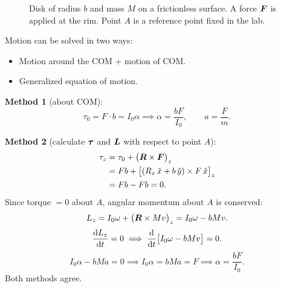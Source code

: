 \begin{example}

\begin{figure}[H]
    \centering
    \caption{Disk of radius $b$ and mass $M$ on a frictionless surface.
             A force $\vect{F}$ is applied at the rim.
             Point $A$ is a reference point fixed in the lab.}
\end{figure}

Motion can be solved in two ways:
\begin{itemize}
    \item Motion around the COM + motion of COM.
    \item Generalized equation of motion.
\end{itemize}

\textbf{Method 1} (about COM):
\[
    \tau_0 = F\cdot b = I_0\alpha \implies \alpha = \frac{bF}{I_0}, \qquad a = \frac{F}{m}.
\]

\textbf{Method 2} (calculate $\vect{\tau}$ and $\vect{L}$ with respect to point $A$):
\begin{align*}
    \tau_z &= \tau_0 + \bigl(\vect{R}\times\vect{F}\bigr)_z \\
    &= Fb + \bigl[(R_x\,\hat{x}+b\,\hat{y})\times F\,\hat{x}\bigr]_z \\
    &= Fb - Fb = 0.
\end{align*}
Since torque $= 0$ about $A$, angular momentum about $A$ is conserved:
\[
    L_z = I_0\omega + \bigl(\vect{R}\times Mv\bigr)_z = I_0\omega - bMv.
\]
\[
    \dv{L_z}{t} = 0 \implies \dv{}{t}\bigl[I_0\omega - bMv\bigr] = 0.
\]
\[
    I_0\alpha - bMa = 0 \implies I_0\alpha = bMa = F \implies \alpha = \frac{bF}{I_0}.
\]
Both methods agree.
\end{example}

